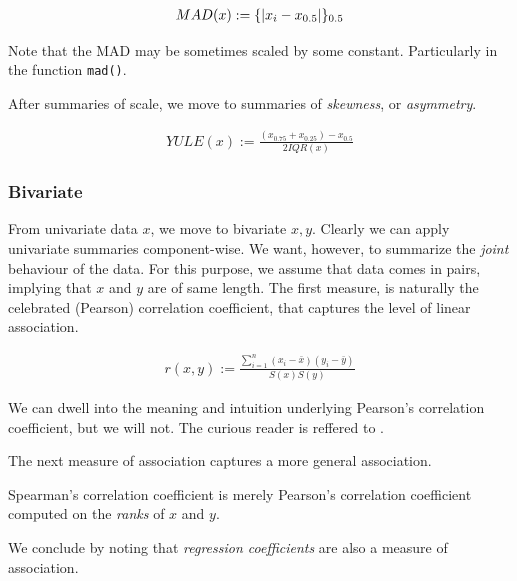 \documentclass[12pt,a4paper]{report}
\begin{document}
\begin{definition}
\begin{align}
	MAD(x):= \{ |x_i-x_{0.5}| \}_{0.5}
\end{align}
\end{definition}
Note that the MAD may be sometimes scaled by some constant. Particularly in the \R function \texttt{mad()}. 


After summaries of scale, we move to summaries of \emph{skewness}, or \emph{asymmetry}.

\begin{definition}
\begin{align}
	YULE(x):= \frac{(x_{0.75}+x_{0.25})-x_{0.5}}{2 IQR(x)}
\end{align}
\end{definition}

 


\subsubsection{Bivariate}
From univariate data $x$, we move to bivariate $x,y$.
Clearly we can apply univariate summaries component-wise. 
We want, however, to summarize the \emph{joint} behaviour of the data. 
For this purpose, we assume that data comes in pairs, implying that $x$ and $y$ are of same length.
The first measure, is naturally the celebrated (Pearson) correlation coefficient, that captures the level of linear association.

\begin{definition}
\begin{align}
	r(x,y):= \frac{\sum_{i=1}^{n} (x_i-\bar{x})(y_i-\bar{y})}{S(x) S(y)}
\end{align}
\end{definition}
We can dwell into the meaning and intuition underlying Pearson's correlation coefficient, but we will not. 
The curious reader is reffered to \cite{rodgers_thirteen_1988}.

The next measure of association captures a more general association.
\begin{definition}
Spearman's correlation coefficient is merely Pearson's correlation coefficient computed on the \emph{ranks} of $x$ and $y$. 
\end{definition}

We conclude by noting that \emph{regression coefficients} are also a measure of association. 
\end{document}
